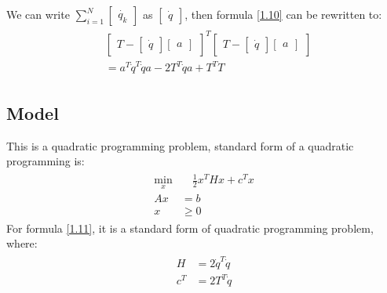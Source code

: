 \documentclass[titlepage,a4paper]{article}
\begin{document}
        We can write $\sum_{i=1}^N \begin{bmatrix} \dot{q_k} \end{bmatrix} $ as $\begin{bmatrix} \dot{q} \end{bmatrix} $, then formula \eqref{1.10} can be rewritten to:
        \begin{align}
        \begin{split}\label{1.11}
            &\begin{bmatrix}T - \begin{bmatrix} \dot{q} \end{bmatrix} \begin{bmatrix} a \end{bmatrix} \end{bmatrix}^T 
            \begin{bmatrix}T - \begin{bmatrix} \dot{q} \end{bmatrix} \begin{bmatrix} a \end{bmatrix} \end{bmatrix}\\
            &= a^T \dot{q}^T \dot{q} a - 2T^T\dot{q}a + T^TT
        \end{split}
        \end{align}
        
    \subsection{Model}
        This is a quadratic programming problem, standard form of a quadratic programming is:
        \begin{align}
        \begin{split}
            \min_x &\quad \frac 12x^THx + c^Tx\\
            Ax &= b\\
            x &\geq 0
        \end{split}
        \end{align} 
        For formula \eqref{1.11}, it is a standard form of quadratic programming problem, where:
        \begin{align}
        \begin{split}\label{1.11}
            H &= 2 \dot{q}^T \dot{q}\\
            c^T &= 2T^T\dot{q}
        \end{split}
        \end{align} 
        
\end{document}
